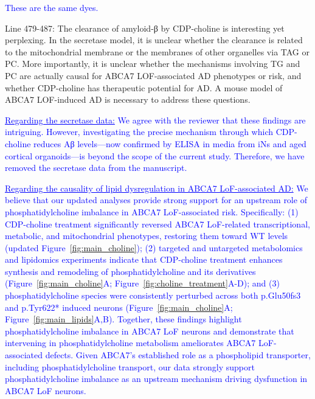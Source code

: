 \textcolor{blue}{These are the same dyes.}

Line 479-487: The clearance of amyloid-β by CDP-choline is interesting yet perplexing. In the secretase model, it is unclear whether the clearance is related to the mitochondrial membrane or the membranes of other organelles via TAG or PC. More importantly, it is unclear whether the mechanisms involving TG and PC are actually causal for ABCA7 LOF-associated AD phenotypes or risk, and whether CDP-choline has therapeutic potential for AD. A mouse model of ABCA7 LOF-induced AD is necessary to address these questions.

\textcolor{blue}{\underline{Regarding the secretase data:} We agree with the reviewer that these findings are intriguing. However, investigating the precise mechanism through which CDP-choline reduces Aβ levels—now confirmed by ELISA in media from iNs and aged cortical organoids—is beyond the scope of the current study. Therefore, we have removed the secretase data from the manuscript.}

\textcolor{blue}{\underline{Regarding the causality of lipid dysregulation in ABCA7 LoF-associated AD:} We believe that our updated analyses provide strong support for an upstream role of phosphatidylcholine imbalance in ABCA7 LoF-associated risk. Specifically: (1) CDP-choline treatment significantly reversed ABCA7 LoF-related transcriptional, metabolic, and mitochondrial phenotypes, restoring them toward WT levels (updated Figure~\ref{fig:main_choline}); (2) targeted and untargeted metabolomics and lipidomics experiments indicate that CDP-choline treatment enhances synthesis and remodeling of phosphatidylcholine and its derivatives (Figure~\ref{fig:main_choline}A; Figure~\ref{fig:choline_treatment}A-D); and (3) phosphatidylcholine species were consistently perturbed across both p.Glu50fs3 and p.Tyr622* induced neurons (Figure~\ref{fig:main_choline}A; Figure~\ref{fig:main_lipids}A,B). Together, these findings highlight phosphatidylcholine imbalance in ABCA7 LoF neurons and demonstrate that intervening in phosphatidylcholine metabolism ameliorates ABCA7 LoF-associated defects. Given ABCA7’s established role as a phospholipid transporter, including phosphatidylcholine transport, our data strongly support phosphatidylcholine imbalance as an upstream mechanism driving dysfunction in ABCA7 LoF neurons.}

